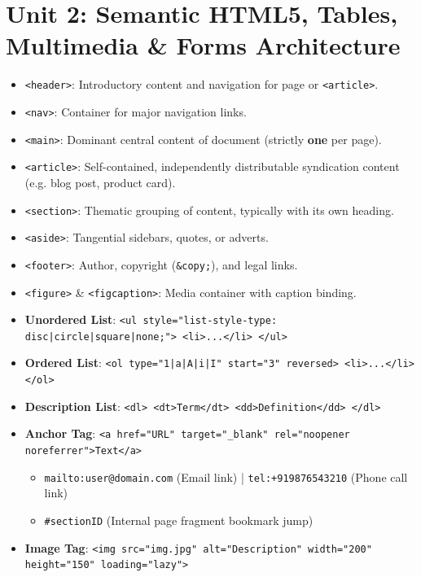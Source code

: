 \documentclass[a4paper,11pt]{article}
\begin{document}
\newpage
\section{Unit 2: Semantic HTML5, Tables, Multimedia \& Forms Architecture}

\begin{conceptbox}
\begin{itemize}[leftmargin=*]
    \item \texttt{<header>}: Introductory content and navigation for page or \texttt{<article>}.
    \item \texttt{<nav>}: Container for major navigation links.
    \item \texttt{<main>}: Dominant central content of document (strictly \textbf{one} per page).
    \item \texttt{<article>}: Self-contained, independently distributable syndication content (e.g. blog post, product card).
    \item \texttt{<section>}: Thematic grouping of content, typically with its own heading.
    \item \texttt{<aside>}: Tangential sidebars, quotes, or adverts.
    \item \texttt{<footer>}: Author, copyright (\texttt{\&copy;}), and legal links.
    \item \texttt{<figure>} \& \texttt{<figcaption>}: Media container with caption binding.
\end{itemize}
\end{conceptbox}

\begin{handwbox}
\begin{itemize}[leftmargin=*]
    \item \textbf{Unordered List}: \texttt{<ul style="list-style-type: disc|circle|square|none;"> <li>...</li> </ul>}
    \item \textbf{Ordered List}: \texttt{<ol type="1|a|A|i|I" start="3" reversed> <li>...</li> </ol>}
    \item \textbf{Description List}: \texttt{<dl> <dt>Term</dt> <dd>Definition</dd> </dl>}
    \item \textbf{Anchor Tag}: \texttt{<a href="URL" target="\_blank" rel="noopener noreferrer">Text</a>}
    \begin{itemize}
        \item \texttt{mailto:user@domain.com} (Email link) | \texttt{tel:+919876543210} (Phone call link)
        \item \texttt{\#sectionID} (Internal page fragment bookmark jump)
    \end{itemize}
    \item \textbf{Image Tag}: \texttt{<img src="img.jpg" alt="Description" width="200" height="150" loading="lazy">}
\end{itemize}
\end{handwbox}
\end{document}
